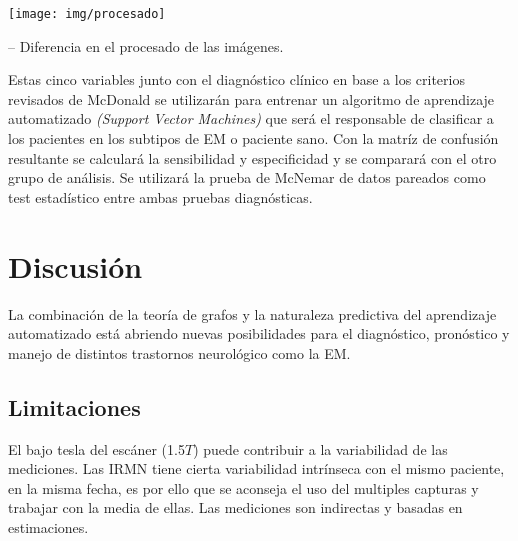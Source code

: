 \documentclass[
		portrait, %
		size=a1paper, %
		color=UICblack,
		margin=3cm,
		bannerheight=11cm
]{uicposter}
\begin{document}
\begin{multicols}{2}
\texttt{[image: img/procesado]}
\begin{small}
	– Diferencia en el procesado de las imágenes.
\end{small}


Estas cinco variables junto con el diagnóstico clínico en base a los criterios revisados de McDonald \cite{Polman2011} se utilizarán para entrenar un algoritmo de aprendizaje automatizado \textit{(Support Vector Machines)} que será el responsable de clasificar a los pacientes en los subtipos de EM o paciente sano. Con la matríz de confusión resultante se calculará la sensibilidad y especificidad y se comparará con el otro grupo de análisis. Se utilizará la prueba de McNemar de datos pareados como test estadístico entre ambas pruebas diagnósticas.


\section*{Discusión}
La combinación de la teoría de grafos y la naturaleza predictiva del aprendizaje automatizado está abriendo nuevas posibilidades para el diagnóstico, pronóstico y manejo de distintos trastornos neurológico como la EM.

\subsection*{Limitaciones}
 El bajo tesla del escáner (1.5$T$) puede contribuir a la variabilidad de las mediciones. Las IRMN tiene cierta variabilidad intrínseca con el mismo paciente, en la misma fecha, es por ello que se aconseja el uso del multiples capturas y trabajar con la media de ellas. Las mediciones son indirectas y basadas en estimaciones.


\small

\end{multicols}
\end{document}
